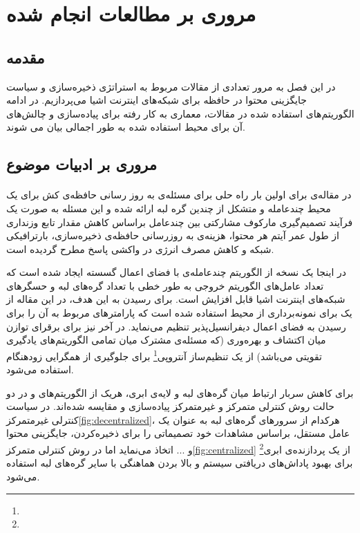 \chapter{مروری بر مطالعات انجام شده}
\section{مقدمه}
در این فصل به مرور تعدادی از مقالات مربوط به استراتژی ذخیره‌سازی و سیاست جایگزینی محتوا در حافظه برای شبکه‌های اینترنت اشیا می‌پردازیم. در ادامه الگوریتم‌های استفاده شده در مقالات، معماری به کار رفته برای پیاده‌سازی و چالش‌های آن برای محیط  استفاده شده به طور اجمالی بیان می شوند. 

\section{مروری بر ادبیات موضوع}

\subsubsection{}
در مقاله‌ی \cite{wu2021caching} برای اولین بار راه حلی برای مسئله‌ی به روز رسانی حافظه‌ی کش برای یک محیط چندعامله و متشکل از چندین گره لبه ارائه شده و این مسئله به صورت یک فرآیند تصمیم‌گیری مارکوف مشارکتی بین چندعامل براساس کاهش مقدار تابع وزنداری از طول عمر آیتم هر محتوا، هزینه‌ی به روزرسانی حافظه‌ی ذخیره‌سازی، بارترافیکی شبکه و کاهش مصرف انرژی در واکشی پاسخ مطرح گردیده است. 

در اینجا یک نسخه از الگوریتم چندعامله‌ی  با فضای اعمال گسسته ایجاد شده است که تعداد عامل‌های الگوریتم خروجی به طور خطی با تعداد گره‌های لبه و حسگرهای شبکه‌های اینترنت اشیا قابل افزایش است. برای رسیدن به این هدف، در این مقاله از یک  برای نمونه‌برداری از محیط استفاده شده است که پارامترهای مربوط به آن را برای رسیدن به فضای اعمال دیفرانسیل‌پذیر تنظیم می‌نماید. در آخر نیز برای برقرای توازن میان اکتشاف و بهره‌وری (که مسئله‌ی مشترک میان تمامی الگوریتم‌های یادگیری تقویتی می‌باشد) از یک تنظیم‌ساز آنتروپی\footnote{} برای جلوگیری از همگرایی زودهنگام استفاده می‌شود.

برای کاهش سربار ارتباط میان گره‌های لبه و لایه‌ی ابری، هریک از الگوریتم‌های  و  در دو حالت روش کنترلی متمرکز و غیرمتمرکز پیاده‌سازی و مقایسه شده‌اند. در سیاست کنترلی غیرمتمرکز\ref{fig:decentralized}، هرکدام از سرورهای گره‌های لبه به عنوان یک عامل مستقل، براساس مشاهدات خود تصمیماتی را برای ذخیره‌کردن، جایگزینی محتوا و ... اتخاذ می‌نماید اما در روش کنترلی متمرکز\ref{fig:centralized} از یک پردازنده‌ی ابری\footnote{} برای بهبود پاداش‌های دریافتی سیستم و بالا بردن هماهنگی با سایر گره‌های لبه استفاده می‌شود.


